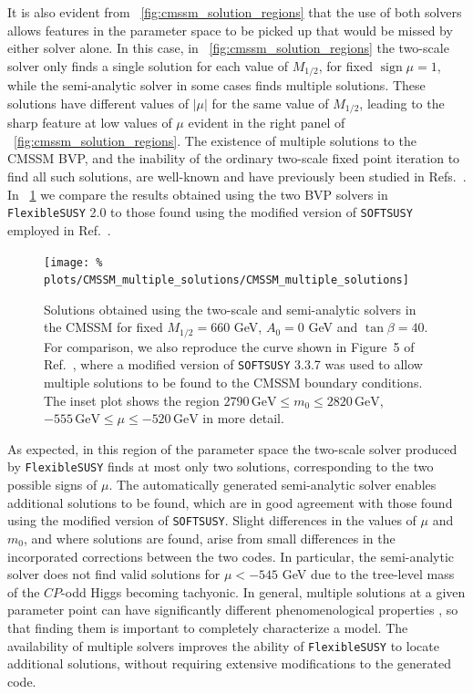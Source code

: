 \documentclass[final,3p,11pt,pdflatex]{elsarticle}
\makeatletter
\newcommand{\fs}{\texttt{FlexibleSUSY}\@\xspace}
\newcommand{\softsusy}{\texttt{SOFTSUSY}\@\xspace}
\newcommand{\fstwo}{\fs 2.0\@\xspace}
\newcommand{\unit}[1]{\,\text{#1}}      %
\newcommand{\figref}[1]{\figurename~\ref{#1}}
\newcommand{\CP}{\ensuremath{CP}\xspace}
\newcommand{\azero}{\ensuremath{A_0}\xspace}
\newcommand{\mhalf}{\ensuremath{M_{1/2}}\xspace}
\newcommand{\mzero}{\ensuremath{m_0}\xspace}
\DeclareMathOperator{\sign}{sign}
\makeatother
\begin{document}
It is also evident from \figref{fig:cmssm_solution_regions} that the use of
both solvers allows features in the parameter space to be picked up that would
be missed by either solver alone.  In this case, in
\figref{fig:cmssm_solution_regions} the two-scale solver only finds a single
solution for each value of $\mhalf$, for fixed $\sign\mu = 1$, while the
semi-analytic solver in some cases finds multiple solutions.  These
solutions have different values of $|\mu|$ for the same value of $\mhalf$,
leading to the sharp feature at low values of $\mu$ evident in the right panel
of \figref{fig:cmssm_solution_regions}.  The existence of multiple solutions to
the CMSSM BVP, and the inability of the ordinary two-scale fixed point iteration
to find all such solutions, are well-known and have previously been studied in
Refs.~\cite{Allanach:2013cda,Allanach:2013yua}.  In
\figref{fig:cmssm_multiple_solutions} we compare the results obtained using
the two BVP solvers in \fstwo to those found using the modified version of
\softsusy employed in Ref.~\cite{Allanach:2013cda}.
%
\begin{figure}
  \centering
  \texttt{[image: \%
    plots/CMSSM\_multiple\_solutions/CMSSM\_multiple\_solutions]}
  \caption{Solutions obtained using the two-scale and semi-analytic solvers
    in the CMSSM for fixed $\mhalf = 660$ GeV, $\azero = 0$ GeV and
    $\tan\beta = 40$.  For comparison, we also reproduce the curve shown in
    Figure~5 of Ref.~\cite{Allanach:2013cda}, where a modified version of
    \softsusy 3.3.7 was used to allow multiple solutions to be found to the
    CMSSM boundary conditions.  The inset plot shows the region $2790\unit{GeV}
    \leq \mzero \leq 2820\unit{GeV}$, $-555\unit{GeV} \leq \mu
    \leq -520\unit{GeV}$ in more detail.}
  \label{fig:cmssm_multiple_solutions}
\end{figure}
%
As expected, in this region of the parameter space the two-scale solver
produced by \fs finds at most only two solutions, corresponding to the two
possible signs of $\mu$.  The automatically generated semi-analytic solver
enables additional solutions to be found, which are in good agreement with
those found using the modified version of \softsusy.  Slight differences in
the values of $\mu$ and $\mzero$, and where solutions are found, arise from
small differences in the incorporated corrections between the two codes.  In
particular, the semi-analytic solver does not find valid solutions for
$\mu < -545$ GeV due to the tree-level mass of the \CP-odd Higgs becoming
tachyonic.  In general, multiple solutions at a given parameter point
can have significantly different phenomenological properties
\cite{Allanach:2013yua}, so that finding them is important to completely
characterize a model.  The availability of multiple solvers improves the
ability of \fs to locate additional solutions, without requiring extensive
modifications to the generated code.
\end{document}
